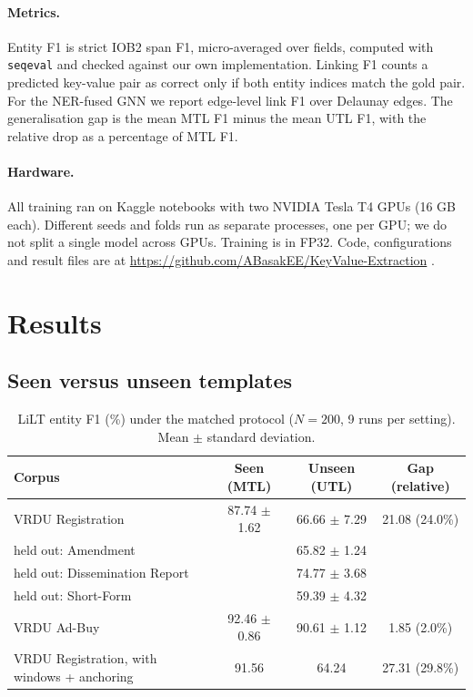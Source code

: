 \documentclass[11pt,a4paper]{article}
\begin{document}
\paragraph{Metrics.} Entity F1 is strict IOB2 span F1, micro-averaged over fields, computed with \texttt{seqeval} and checked against our own implementation. Linking F1 counts a predicted key-value pair as correct only if both entity indices match the gold pair. For the NER-fused GNN we report edge-level link F1 over Delaunay edges. The generalisation gap is the mean MTL F1 minus the mean UTL F1, with the relative drop as a percentage of MTL F1.

\paragraph{Hardware.} All training ran on Kaggle notebooks with two NVIDIA Tesla T4 GPUs (16 GB each). Different seeds and folds run as separate processes, one per GPU; we do not split a single model across GPUs. Training is in FP32. Code, configurations and result files are at \url{https://github.com/ABasakEE/KeyValue-Extraction} \cite{ourrepo}.

\section{Results}

\subsection{Seen versus unseen templates}

\begin{table}[H]
\centering\small
\caption{LiLT entity F1 (\%) under the matched protocol ($N=200$, 9 runs per setting). Mean $\pm$ standard deviation.}
\label{tab:gap}
\begin{tabular}{@{}lccc@{}}
\toprule
Corpus & Seen (MTL) & Unseen (UTL) & Gap (relative) \\
\midrule
VRDU Registration & 87.74 $\pm$ 1.62 & 66.66 $\pm$ 7.29 & 21.08 (24.0\%) \\
\quad held out: Amendment & & 65.82 $\pm$ 1.24 & \\
\quad held out: Dissemination Report & & 74.77 $\pm$ 3.68 & \\
\quad held out: Short-Form & & 59.39 $\pm$ 4.32 & \\
VRDU Ad-Buy & 92.46 $\pm$ 0.86 & 90.61 $\pm$ 1.12 & 1.85 (2.0\%) \\
VRDU Registration, with windows + anchoring & 91.56 & 64.24 & 27.31 (29.8\%) \\
\bottomrule
\end{tabular}
\end{table}
\end{document}
